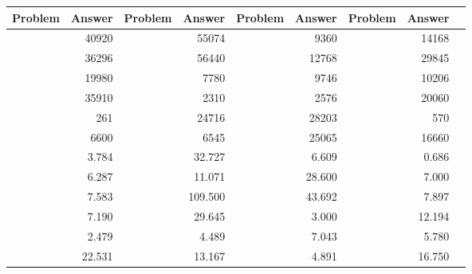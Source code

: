 \LARGE
\begin{tabular}{|l|r|r|r|r|r|r|r|r|}
\toprule
Problem &  Answer & Problem &   Answer & Problem &  Answer & Problem &  Answer \\ \midrule
\midrule
        &   40920 &         &    55074 &         &    9360 &         &   14168 \\ \midrule
        &   36296 &         &    56440 &         &   12768 &         &   29845 \\ \midrule
        &   19980 &         &     7780 &         &    9746 &         &   10206 \\ \midrule
        &   35910 &         &     2310 &         &    2576 &         &   20060 \\ \midrule
        &     261 &         &    24716 &         &   28203 &         &     570 \\ \midrule
        &    6600 &         &     6545 &         &   25065 &         &   16660 \\ \midrule
        &   3.784 &         &   32.727 &         &   6.609 &         &   0.686 \\ \midrule
        &   6.287 &         &   11.071 &         &  28.600 &         &   7.000 \\ \midrule
        &   7.583 &         &  109.500 &         &  43.692 &         &   7.897 \\ \midrule
        &   7.190 &         &   29.645 &         &   3.000 &         &  12.194 \\ \midrule
        &   2.479 &         &    4.489 &         &   7.043 &         &   5.780 \\ \midrule
        &  22.531 &         &   13.167 &         &   4.891 &         &  16.750 \\ \midrule
\bottomrule
\end{tabular}
